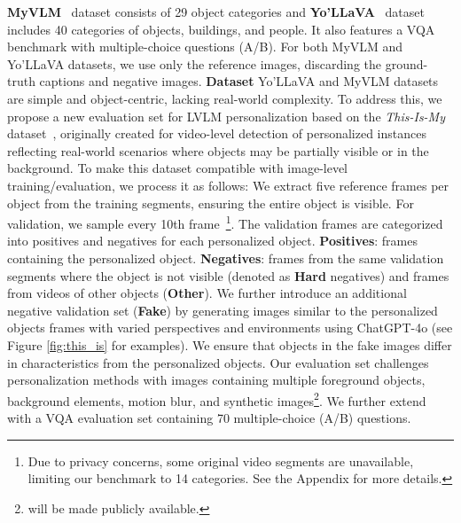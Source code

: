  \textbf{MyVLM}~\cite{alaluf2024myvlm} dataset consists of 29 object categories and \textbf{Yo’LLaVA}~\cite{nguyen2024yo} dataset includes 40 categories of objects, buildings, and people. It also features a VQA benchmark with multiple-choice questions (A/B). For both MyVLM and Yo’LLaVA datasets, we use only the reference images, discarding the ground-truth captions and negative images. %
\textbf{\thisismy Dataset} Yo’LLaVA and MyVLM datasets are simple and object-centric, lacking real-world complexity. To address this, we propose a new evaluation set for LVLM personalization based on the \textit{This-Is-My} dataset~\cite{yeh2023meta}, originally created for video-level detection of personalized instances reflecting real-world scenarios where objects may be partially visible or in the background.
To make this dataset compatible with image-level training/evaluation, we process it as follows: We extract five reference frames per object from the training segments, ensuring the entire object is visible. For validation, we sample every 10th frame~\footnote{Due to privacy concerns, some original video segments are unavailable, limiting our benchmark to 14 categories. See the Appendix for more details.}. The validation frames are categorized into positives and negatives for each personalized object. 
\textbf{Positives}: frames containing the personalized object. \textbf{Negatives}: frames from the same validation segments where the object is not visible (denoted as \textbf{Hard} negatives) and frames from videos of other objects (\textbf{Other}). We further introduce an additional  negative validation set (\textbf{Fake}) by generating images similar to the personalized objects frames with varied perspectives and environments using ChatGPT-4o (see Figure \ref{fig:this_is} for examples). We ensure that objects in the fake images differ in characteristics from the personalized objects. Our evaluation set challenges \VLM personalization methods with images containing multiple foreground objects, background elements, motion blur, and synthetic images\footnote{\thisismy will be made publicly available.}. We further extend \thisismy 
 with a VQA evaluation set containing 70 multiple-choice (A/B) questions.\\ %
